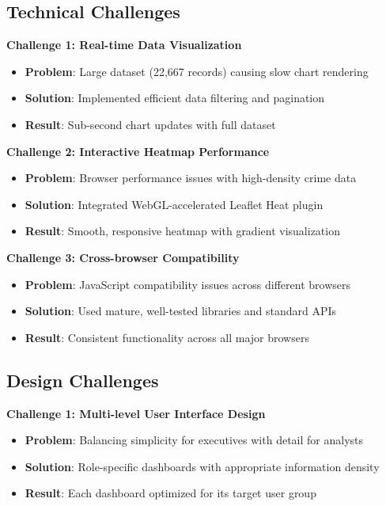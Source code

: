 \documentclass[12pt,a4paper]{article}
\begin{document}
\subsection{Technical Challenges}

\textbf{Challenge 1: Real-time Data Visualization}
\begin{itemize}
    \item \textbf{Problem}: Large dataset (22,667 records) causing slow chart rendering
    \item \textbf{Solution}: Implemented efficient data filtering and pagination
    \item \textbf{Result}: Sub-second chart updates with full dataset
\end{itemize}

\textbf{Challenge 2: Interactive Heatmap Performance}
\begin{itemize}
    \item \textbf{Problem}: Browser performance issues with high-density crime data
    \item \textbf{Solution}: Integrated WebGL-accelerated Leaflet Heat plugin
    \item \textbf{Result}: Smooth, responsive heatmap with gradient visualization
\end{itemize}

\textbf{Challenge 3: Cross-browser Compatibility}
\begin{itemize}
    \item \textbf{Problem}: JavaScript compatibility issues across different browsers
    \item \textbf{Solution}: Used mature, well-tested libraries and standard APIs
    \item \textbf{Result}: Consistent functionality across all major browsers
\end{itemize}

\subsection{Design Challenges}

\textbf{Challenge 1: Multi-level User Interface Design}
\begin{itemize}
    \item \textbf{Problem}: Balancing simplicity for executives with detail for analysts
    \item \textbf{Solution}: Role-specific dashboards with appropriate information density
    \item \textbf{Result}: Each dashboard optimized for its target user group
\end{itemize}
\end{document}
